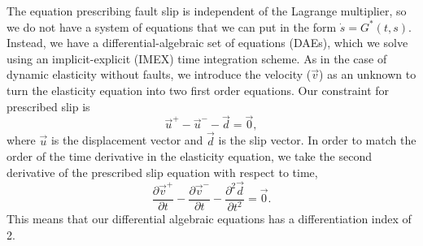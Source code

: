 The equation prescribing fault slip is independent of the Lagrange multiplier, so we do not have a system of equations that we can put in
the form $\dot{s} = G^*(t,s)$.
Instead, we have a differential-algebraic set of equations (DAEs), which we solve using an implicit-explicit (IMEX) time integration scheme.
As in the case of dynamic elasticity without faults, we introduce the velocity ($\vec{v}$) as an unknown to turn the elasticity equation into two first order equations.
Our constraint for prescribed slip is
\begin{equation}
  \vec{u}^+ - \vec{u}^- - \vec{d} = \vec{0},
\end{equation}
where $\vec{u}$ is the displacement vector and $\vec{d}$ is the slip vector.
In order to match the order of the time derivative in the elasticity equation, we take the second derivative of the prescribed slip equation with respect to time,
\begin{equation}
  \frac{\partial \vec{v}^+}{\partial t} - \frac{\partial \vec{v}^-}{\partial t} - \frac{\partial^2 \vec{d}}{\partial t^2} = \vec{0}.
\end{equation}
This means that our differential algebraic equations has a differentiation index of 2.

